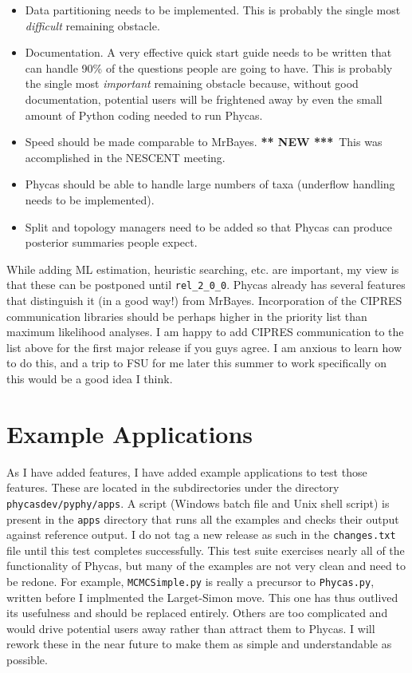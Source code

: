 \documentclass[10pt]{article}
\newcommand{\new}{{\bfseries *** NEW ***}}
\begin{document}
\begin{itemize}
\item Data partitioning needs to be implemented. This is probably the single most {\em difficult} remaining obstacle.
\item Documentation. A very effective quick start guide needs to be written that can handle 90\% of the questions people are going to have. This is probably the single most {\em important} remaining obstacle because, without good documentation, potential users will be frightened away by even the small amount of Python coding needed to run Phycas.
\item Speed should be made comparable to MrBayes. \new\ This was accomplished in the NESCENT meeting.
\item Phycas should be able to handle large numbers of taxa (underflow handling needs to be implemented).
\item Split and topology managers need to be added so that Phycas can produce posterior summaries people expect.
\end{itemize}

While adding ML estimation, heuristic searching, etc. are important, my view is that these can be postponed until \verb+rel_2_0_0+. Phycas already has several features that distinguish it (in a good way!) from MrBayes. Incorporation of the CIPRES communication libraries should be perhaps higher in the priority list than maximum likelihood analyses. I am happy to add CIPRES communication to the list above for the first major release if you guys agree. I am anxious to learn how to do this, and a trip to FSU for me later this summer to work specifically on this would be a good idea I think.

\section{Example Applications}

As I have added features, I have added example applications to test those features. These are located in the subdirectories under the directory {\tt phycasdev/pyphy/apps}. A script (Windows batch file and Unix shell script) is present in the {\tt apps} directory that runs all the examples and checks their output against reference output. I do not tag a new release as such in the {\tt changes.txt} file until this test completes successfully. This test suite exercises nearly all of the functionality of Phycas, but many of the examples are not very clean and need to be redone. For example, {\tt MCMCSimple.py} is really a precursor to {\tt Phycas.py}, written before I implmented the Larget-Simon move. This one has thus outlived its usefulness and should be replaced entirely. Others are too complicated and would drive potential users away rather than attract them to Phycas. I will rework these in the near future to make them as simple and understandable as possible.
\end{document}
